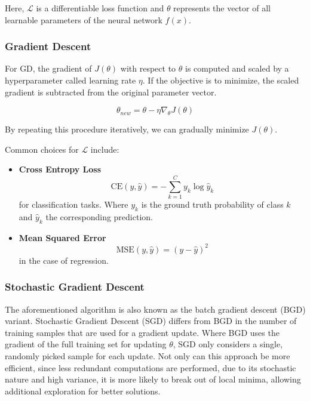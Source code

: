 Here, $\mathcal{L}$ is a differentiable loss function and $\theta$ represents the vector of all learnable parameters of the neural network $f(x)$.

\subsubsection{Gradient Descent}
For GD, the gradient of $J(\theta)$ with respect to $\theta$ is computed and scaled by a hyperparameter called learning rate $\eta$. If the objective is to minimize, the scaled gradient is subtracted from the original parameter vector.

\begin{equation}
    \theta_{new} = \theta - \eta\nabla_\theta J(\theta)
\end{equation}

By repeating this procedure iteratively, we can gradually minimize $J(\theta)$.

Common choices for $\mathcal{L}$ include:
\begin{itemize}
    \item \textbf{Cross Entropy Loss}
          \begin{equation}
              \text{CE}(y, \hat{y}) = - \sum_{k=1}^C y_k \log \hat{y}_k
          \end{equation}
          for classification tasks. Where $y_k$ is the ground truth probability of class $k$ and $\hat{y}_k$ the corresponding prediction.

    \item \textbf{Mean Squared Error}
          \begin{equation}
              \text{MSE}(y, \hat{y}) = (y - \hat{y})^2
          \end{equation}
          in the case of regression.
\end{itemize}

\subsubsection{Stochastic Gradient Descent}
The aforementioned algorithm is also known as the batch gradient descent (BGD) variant. Stochastic Gradient Descent (SGD) differs from BGD in the number of training samples that are used for a gradient update. Where BGD uses the gradient of the full training set for updating $\theta$, SGD only considers a single, randomly picked sample for each update. Not only can this approach be more efficient, since less redundant computations are performed, due to its stochastic nature and high variance, it is more likely to break out of local minima, allowing additional exploration for better solutions. \cite{ruder2016overview}


